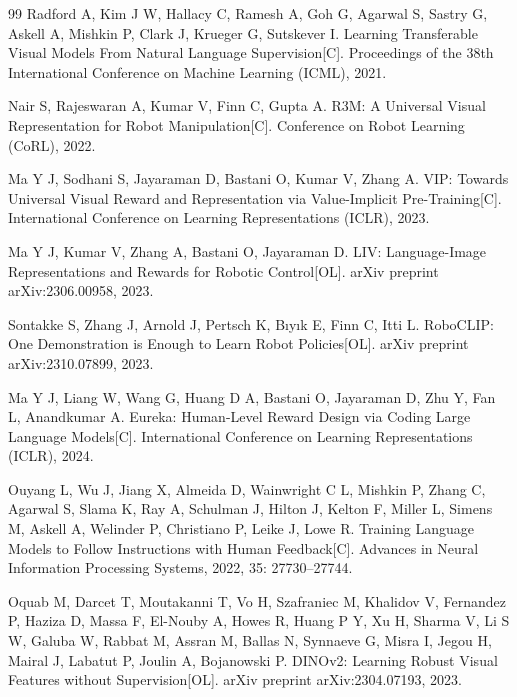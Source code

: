 \begin{thebibliography}{99}
    Radford A, Kim J W, Hallacy C, Ramesh A, Goh G, Agarwal S, Sastry G, Askell A, Mishkin P, Clark J, Krueger G, Sutskever I.
    Learning Transferable Visual Models From Natural Language Supervision[C].
    Proceedings of the 38th International Conference on Machine Learning (ICML), 2021.
    
    Nair S, Rajeswaran A, Kumar V, Finn C, Gupta A.
    R3M: A Universal Visual Representation for Robot Manipulation[C].
    Conference on Robot Learning (CoRL), 2022.
    
    Ma Y J, Sodhani S, Jayaraman D, Bastani O, Kumar V, Zhang A.
    VIP: Towards Universal Visual Reward and Representation via Value-Implicit Pre-Training[C].
    International Conference on Learning Representations (ICLR), 2023.
    
    Ma Y J, Kumar V, Zhang A, Bastani O, Jayaraman D.
    LIV: Language-Image Representations and Rewards for Robotic Control[OL].
    arXiv preprint arXiv:2306.00958, 2023.
    
    Sontakke S, Zhang J, Arnold J, Pertsch K, Bıyık E, Finn C, Itti L.
    RoboCLIP: One Demonstration is Enough to Learn Robot Policies[OL].
    arXiv preprint arXiv:2310.07899, 2023.
    
    Ma Y J, Liang W, Wang G, Huang D A, Bastani O, Jayaraman D, Zhu Y, Fan L, Anandkumar A.
    Eureka: Human-Level Reward Design via Coding Large Language Models[C].
    International Conference on Learning Representations (ICLR), 2024.
    
    Ouyang L, Wu J, Jiang X, Almeida D, Wainwright C L, Mishkin P, Zhang C, Agarwal S, Slama K, Ray A, Schulman J, Hilton J, Kelton F, Miller L, Simens M, Askell A, Welinder P, Christiano P, Leike J, Lowe R.
    Training Language Models to Follow Instructions with Human Feedback[C].
    Advances in Neural Information Processing Systems, 2022, 35: 27730--27744.
    
    Oquab M, Darcet T, Moutakanni T, Vo H, Szafraniec M, Khalidov V, Fernandez P, Haziza D, Massa F, El-Nouby A, Howes R, Huang P Y, Xu H, Sharma V, Li S W, Galuba W, Rabbat M, Assran M, Ballas N, Synnaeve G, Misra I, Jegou H, Mairal J, Labatut P, Joulin A, Bojanowski P.
    DINOv2: Learning Robust Visual Features without Supervision[OL].
    arXiv preprint arXiv:2304.07193, 2023.
    

\end{thebibliography}
